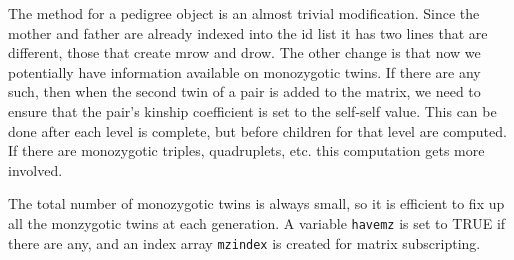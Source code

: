 \documentclass{article}
\begin{document}
The method for a pedigree object is an almost trivial modification.  Since the
mother and father are already indexed into the id list it has 
two lines that are different, those that create mrow and drow.
The other change is that now we potentially have information available
on monozygotic twins.  If there are any such, then when the second
twin of a pair is added to the matrix, we need to ensure that the
pair's kinship coefficient is set to the self-self value.
This can be done after each level is complete, but before children
for that level are computed.
If there are monozygotic triples, quadruplets, etc. this computation gets 
more involved.

The total number of monozygotic twins is always small, so it is efficient to
fix up all the monzygotic twins at each generation.
A variable \Verb!havemz! is set to TRUE if there are any, and an index array
\Verb!mzindex! is created for matrix subscripting.
\end{document}
